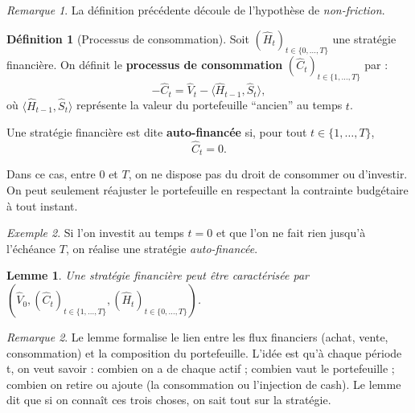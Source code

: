 \documentclass[12pt,a4paper]{article}
\numberwithin{equation}{section}
\theoremstyle{plain} %
\newtheorem{lemme}{Lemme}
\theoremstyle{definition} %
\newtheorem{definition}{Définition}          %
\theoremstyle{remark} %
\newtheorem*{remarque}{Remarque}
\theoremstyle{myexample}
\newtheorem{exemple}[definition]{Exemple}
\theoremstyle{definition}
\begin{document}
\begin{remarque}
La définition précédente découle de l’hypothèse de \emph{non-friction}.
\end{remarque}

\begin{definition}[Processus de consommation]
Soit $(\hat H_t)_{t\in\{0,\ldots,T\}}$ une stratégie financière.  
On définit le \textbf{processus de consommation} $(\hat C_t)_{t\in\{1,\ldots,T\}}$ par :
\[
-\hat C_t = \hat V_t - \langle \hat H_{t-1}, \hat S_t \rangle,
\]
où $\langle \hat H_{t-1}, \hat S_t \rangle$ représente la valeur du portefeuille ``ancien'' au temps $t$.

Une stratégie financière est dite \textbf{auto-financée} si, pour tout $t\in\{1,\ldots,T\}$,
\[
\hat C_t = 0.
\]
\end{definition}

\medskip

Dans ce cas, entre $0$ et $T$, on ne dispose pas du droit de consommer ou d’investir.  
On peut seulement réajuster le portefeuille en respectant la contrainte budgétaire à tout instant.

\begin{exemple}
Si l’on investit au temps $t=0$ et que l’on ne fait rien jusqu’à l’échéance $T$, on réalise une stratégie \emph{auto-financée}.
\end{exemple}

\begin{lemme}
Une stratégie financière peut être caractérisée par $(\hat V_0, (\hat C_t)_{t\in\{1,\ldots,T\}}, (\hat H_t)_{t\in\{0,\ldots,T\}})$.
\end{lemme}

\begin{remarque}
Le lemme formalise le lien entre les flux financiers (achat, vente, consommation) et la composition du portefeuille.
L’idée est qu’à chaque période t, on veut savoir :
combien on a de chaque actif ;
combien vaut le portefeuille ;
combien on retire ou ajoute (la consommation ou l'injection de cash).
Le lemme dit que si on connaît ces trois choses, on sait tout sur la stratégie.
\end{remarque}
\end{document}
